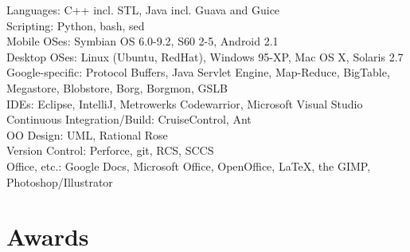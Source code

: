\documentclass[margin,line]{resume}
\begin{document}
\begin{resume}
    Languages: C++ incl. STL, Java incl. Guava and Guice            \vspace{0.5mm}\\%
    Scripting: Python, bash, sed              \vspace{0.5mm}\\%
    Mobile OSes: Symbian OS 6.0-9.2, S60 2-5, Android 2.1               \vspace{0.5mm}\\%
    Desktop OSes: Linux (Ubuntu, RedHat), Windows 95-XP, Mac OS X, Solaris 2.7          \vspace{0.5mm}\\%
    Google-specific: Protocol Buffers, Java Servlet Engine, Map-Reduce, BigTable, Megastore, Blobstore, Borg, Borgmon, GSLB         \vspace{0.5mm}\\%
    IDEs: Eclipse, IntelliJ, Metrowerks Codewarrior, Microsoft Visual Studio              \vspace{0.5mm}\\%
    Continuous Integration/Build: CruiseControl, Ant              \vspace{0.5mm}\\%
    OO Design: UML, Rational Rose               \vspace{0.5mm}\\%
    Version Control: Perforce, git, RCS, SCCS              \vspace{0.5mm}\\%
    Office, etc.: Google Docs, Microsoft Office, OpenOffice, \LaTeX, the GIMP, Photoshop/Illustrator

    \section{\mysidestyle Awards} 


\end{resume}
\end{document}
